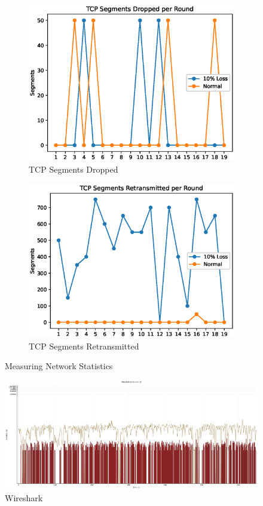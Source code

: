 \documentclass[12pt]{article}
\begin{document}
\begin{figure}
\begin{subfigure}[b]{.475\linewidth}
  \includegraphics[width=\linewidth]{tcp-dropped}
  \caption{TCP Segments Dropped}
  \label{fig:tcp-dropped}
\end{subfigure}\hfill
\begin{subfigure}[b]{.475\linewidth}
  \includegraphics[width=\linewidth]{tcp-rexmit}
  \caption{TCP Segments Retransmitted}
  \label{fig:tcp-rexmit}
\end{subfigure}
  \caption{Measuring Network Statistics}
\end{figure}

\begin{figure}
  \includegraphics[width=\linewidth]{wireshark}
  \caption{Wireshark}
  \label{fig:wireshark}
\end{figure}
\end{document}
